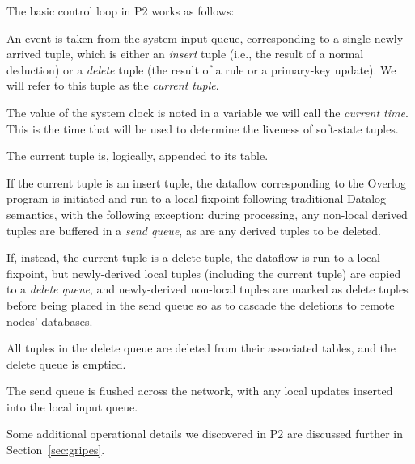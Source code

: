 The basic control loop in P2 works as follows:
\begin{CompactEnumerate}
    \item An event is taken from the system input queue, corresponding to a single newly-arrived tuple, which is either an {\em insert} tuple (i.e., the result of a normal deduction) or a {\em delete} tuple (the result of a  rule or a primary-key update).  We will refer to this tuple as the {\em current tuple}.
    \item The value of the system clock is noted in a variable we will call the {\em current time}.  This is the time that will be used to determine the liveness of soft-state tuples.  
    \item The current tuple is, logically, appended to its table.
    \item If the current tuple is an insert tuple, the dataflow corresponding to the Overlog program is initiated and run to a local fixpoint following traditional Datalog semantics, with the following exception: during processing, any non-local derived tuples are buffered in a {\em send queue}, as are any derived tuples to be deleted.
    \item If, instead, the current tuple is a delete tuple, the dataflow
    is run to a local fixpoint, but newly-derived local tuples
    (including the current tuple) are copied to a {\em delete queue},
    and newly-derived non-local tuples are marked as delete tuples
    before being placed in the send queue so as to cascade the deletions
    to remote nodes' databases.
    \item All tuples in the delete queue are deleted from their associated tables, and the delete queue is emptied.
    \item The send queue is flushed across the network, with any local updates inserted into the local input queue.
\end{CompactEnumerate}
Some additional operational details we discovered in P2 are discussed
further in Section~\ref{sec:gripes}.


